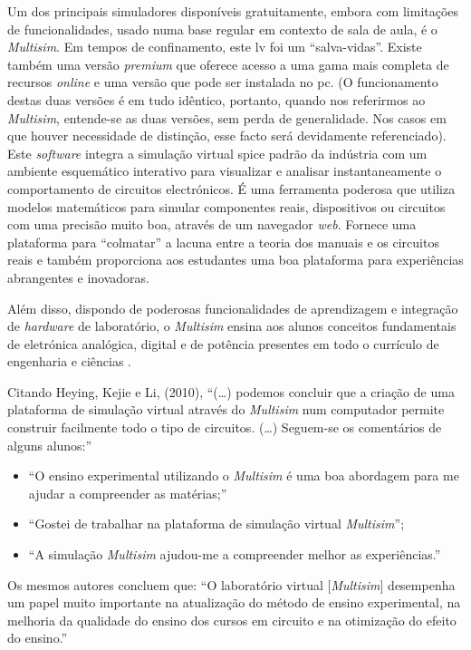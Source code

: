 Um dos principais simuladores disponíveis gratuitamente, embora com limitações de funcionalidades, usado numa base regular em contexto de sala de aula, é o \textit{Multisim}\cite{multisim}. Em tempos de confinamento, este \acrshort{lv} foi um ``salva-vidas''. Existe também uma versão \textit{premium} que oferece acesso a uma gama mais completa de recursos \textit{online} e uma versão que pode ser instalada no \acrshort{pc}. (O funcionamento destas duas versões é em tudo idêntico, portanto, quando nos referirmos ao \textit{Multisim}\cite{multisim}, entende-se as duas versões, sem perda de generalidade. Nos casos em que houver necessidade de distinção, esse facto será devidamente referenciado).
Este \textit{software} integra a simulação virtual \acrfull{spice} padrão da indústria com um ambiente esquemático interativo para visualizar e analisar instantaneamente o comportamento de circuitos electrónicos. É uma ferramenta poderosa que utiliza modelos matemáticos para simular componentes reais, dispositivos ou circuitos com uma precisão muito boa, através de um navegador \textit{web}. Fornece uma plataforma para ``colmatar'' a lacuna entre a teoria dos manuais e os circuitos reais e também proporciona aos estudantes uma boa plataforma para experiências abrangentes e inovadoras\cite{multisim}.

Além disso, dispondo de poderosas funcionalidades de aprendizagem e integração de \textit{hardware} de laboratório, o \textit{Multisim} ensina aos alunos conceitos fundamentais de eletrónica analógica, digital e de potência presentes em todo o currículo de engenharia e ciências \cite{ImportantSimSoftware}.

Citando Heying, Kejie e Li, (2010), ``(\ldots) podemos concluir que a criação de uma plataforma de simulação virtual através do \textit{Multisim} num computador permite construir facilmente todo o tipo de circuitos. (\ldots) Seguem-se os comentários de alguns alunos:''
\begin{itemize}
    \item ``O ensino experimental utilizando o \textit{Multisim} é uma boa abordagem para me ajudar a compreender as matérias;''
    \item ``Gostei de trabalhar na plataforma de simulação virtual \textit{Multisim}'';
    \item ``A simulação \textit{Multisim} ajudou-me a compreender melhor as experiências.''
\end{itemize}

Os mesmos autores concluem que: ``O laboratório virtual [\textit{Multisim}] desempenha um papel muito importante na atualização do método de ensino experimental, na melhoria da qualidade do ensino dos cursos em circuito e na otimização do efeito do ensino.''\cite{heying}

